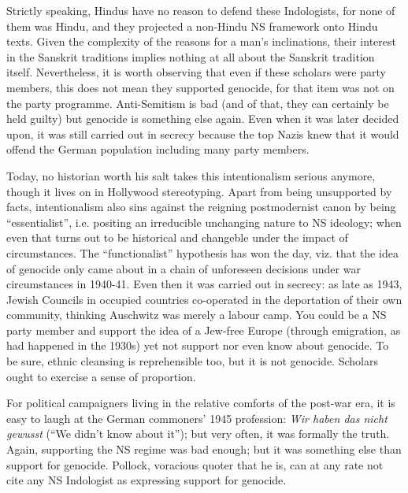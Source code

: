 Strictly speaking, Hindus have no reason to defend these Indologists, for none of them was Hindu, and they projected a non-Hindu NS framework onto Hindu texts. Given the complexity of the reasons for a man’s inclinations, their interest in the Sanskrit traditions implies nothing at all about the Sanskrit tradition itself. Nevertheless, it is worth observing that even if these scholars were party members, this does not mean they supported genocide, for that item was not on the party programme. Anti-Semitism is bad (and of that, they can certainly be held guilty) but genocide is something else again. Even when it was later decided upon, it was still carried out in secrecy because the top Nazis knew that it would offend the German population including many party members.

Today, no historian worth his salt takes this intentionalism serious anymore, though it lives on in Hollywood stereotyping. Apart from being unsupported by facts, intentionalism also sins against the reigning postmodernist canon by being “essentialist”, i.e. positing an irreducible unchanging nature to NS ideology; when even that turns out to be historical and changeble under the impact of circumstances. The “functionalist” hypothesis has won the day, viz. that the idea of genocide only came about in a chain of unforeseen decisions under war circumstances in 1940-41. Even then it was carried out in secrecy: as late as 1943, Jewish Councils in occupied countries co-operated in the deportation of their own community, thinking Auschwitz was merely a labour camp. You could be a NS party member and support the idea of a Jew-free Europe (through emigration, as had happened in the 1930s) yet not support nor even know about genocide. To be sure, ethnic cleansing is reprehensible too, but it is not genocide. Scholars ought to exercise a sense of proportion.

For political campaigners living in the relative comforts of the post-war era, it is easy to laugh at the German commoners’ 1945 profession: {\sl Wir haben das nicht gewusst} (“We didn’t know about it”); but very often, it was formally the truth. Again, supporting the NS regime was bad enough; but it was something else than support for genocide. Pollock, voracious quoter that he is, can at any rate not cite any NS Indologist as expressing support for genocide.

